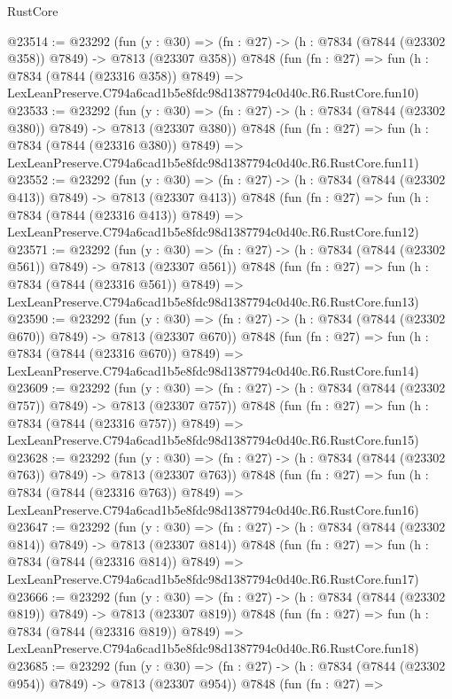 \begin{lexlean}{RustCore}
\begin{coremodule}
@23514 := @23292
    (fun (y : @30) => (fn : @27) -> (h : @7834 (@7844 (@23302 @358)) @7849) -> @7813 (@23307 @358))
    @7848
    (fun (fn : @27) =>
    fun (h : @7834 (@7844 (@23316 @358)) @7849) =>
    LexLeanPreserve.C794a6cad1b5e8fdc98d1387794c0d40c.R6.RustCore.fun10)
@23533 := @23292
    (fun (y : @30) => (fn : @27) -> (h : @7834 (@7844 (@23302 @380)) @7849) -> @7813 (@23307 @380))
    @7848
    (fun (fn : @27) =>
    fun (h : @7834 (@7844 (@23316 @380)) @7849) =>
    LexLeanPreserve.C794a6cad1b5e8fdc98d1387794c0d40c.R6.RustCore.fun11)
@23552 := @23292
    (fun (y : @30) => (fn : @27) -> (h : @7834 (@7844 (@23302 @413)) @7849) -> @7813 (@23307 @413))
    @7848
    (fun (fn : @27) =>
    fun (h : @7834 (@7844 (@23316 @413)) @7849) =>
    LexLeanPreserve.C794a6cad1b5e8fdc98d1387794c0d40c.R6.RustCore.fun12)
@23571 := @23292
    (fun (y : @30) => (fn : @27) -> (h : @7834 (@7844 (@23302 @561)) @7849) -> @7813 (@23307 @561))
    @7848
    (fun (fn : @27) =>
    fun (h : @7834 (@7844 (@23316 @561)) @7849) =>
    LexLeanPreserve.C794a6cad1b5e8fdc98d1387794c0d40c.R6.RustCore.fun13)
@23590 := @23292
    (fun (y : @30) => (fn : @27) -> (h : @7834 (@7844 (@23302 @670)) @7849) -> @7813 (@23307 @670))
    @7848
    (fun (fn : @27) =>
    fun (h : @7834 (@7844 (@23316 @670)) @7849) =>
    LexLeanPreserve.C794a6cad1b5e8fdc98d1387794c0d40c.R6.RustCore.fun14)
@23609 := @23292
    (fun (y : @30) => (fn : @27) -> (h : @7834 (@7844 (@23302 @757)) @7849) -> @7813 (@23307 @757))
    @7848
    (fun (fn : @27) =>
    fun (h : @7834 (@7844 (@23316 @757)) @7849) =>
    LexLeanPreserve.C794a6cad1b5e8fdc98d1387794c0d40c.R6.RustCore.fun15)
@23628 := @23292
    (fun (y : @30) => (fn : @27) -> (h : @7834 (@7844 (@23302 @763)) @7849) -> @7813 (@23307 @763))
    @7848
    (fun (fn : @27) =>
    fun (h : @7834 (@7844 (@23316 @763)) @7849) =>
    LexLeanPreserve.C794a6cad1b5e8fdc98d1387794c0d40c.R6.RustCore.fun16)
@23647 := @23292
    (fun (y : @30) => (fn : @27) -> (h : @7834 (@7844 (@23302 @814)) @7849) -> @7813 (@23307 @814))
    @7848
    (fun (fn : @27) =>
    fun (h : @7834 (@7844 (@23316 @814)) @7849) =>
    LexLeanPreserve.C794a6cad1b5e8fdc98d1387794c0d40c.R6.RustCore.fun17)
@23666 := @23292
    (fun (y : @30) => (fn : @27) -> (h : @7834 (@7844 (@23302 @819)) @7849) -> @7813 (@23307 @819))
    @7848
    (fun (fn : @27) =>
    fun (h : @7834 (@7844 (@23316 @819)) @7849) =>
    LexLeanPreserve.C794a6cad1b5e8fdc98d1387794c0d40c.R6.RustCore.fun18)
@23685 := @23292
    (fun (y : @30) => (fn : @27) -> (h : @7834 (@7844 (@23302 @954)) @7849) -> @7813 (@23307 @954))
    @7848
    (fun (fn : @27) =>

\end{coremodule}
\end{lexlean}

